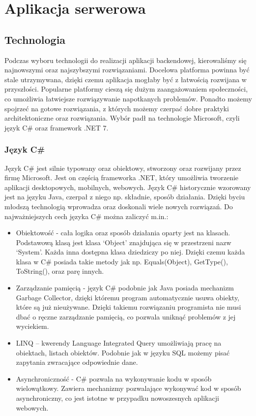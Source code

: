 \documentclass[a4paper,twoside,12pt]{book}
\begin{document}
\chapter{Aplikacja serwerowa}
\section{Technologia}
Podczas wyboru technologii do realizacji aplikacji backendowej, kierowaliśmy się najnowszymi oraz najszybszymi rozwiązaniami. Docelowa platforma powinna być stale utrzymywana, dzięki czemu aplikacja mogłaby być z łatwością rozwijana w przyszłości. Popularne platformy cieszą się dużym zaangażowaniem społeczności, co umożliwia łatwiejsze rozwiązywanie napotkanych problemów. Ponadto możemy spojrzeć na gotowe rozwiązania, z których możemy czerpać dobre praktyki architektoniczne oraz rozwiązania. Wybór padł na technologie Microsoft, czyli język C\# oraz framework .NET 7.  

\subsection{Język C\#}
Język C\# jest silnie typowany oraz obiektowy, stworzony oraz rozwijany przez firmę Microsoft. Jest on częścią frameworka .NET, który umożliwia tworzenie aplikacji desktopowych, mobilnych, webowych.  Język C\# historycznie wzorowany jest na języku Java, czerpał z niego np. składnie, sposób działania. Dzięki byciu młodszą technologią wprowadza oraz doskonali wiele nowych rozwiązań.  
Do najważniejszych cech języka C\# można zaliczyć m.in.: 
\begin{itemize}
    \item Obiektowość - cała logika oraz sposób działania oparty jest na klasach. Podstawową klasą jest klasa ‘Object’ znajdująca się w przestrzeni nazw ‘System’. Każda inna dostępna klasa dziedziczy po niej. Dzięki czemu każda klasa w C\# posiada takie metody jak np. Equals(Object), GetType(), ToString(), oraz parę innych. 
    \item Zarządzanie pamięcią - język C\# podobnie jak Java posiada mechanizm Garbage Collector, dzięki któremu program automatycznie usuwa obiekty, które są już nieużywane. Dzięki takiemu rozwiązaniu programista nie musi dbać o ręczne zarządzanie pamięcią, co pozwala uniknąć problemów z jej wyciekiem. 
    \item LINQ – kwerendy Language Integrated Query umożliwiają pracę na obiektach, listach obiektów. Podobnie jak w języku SQL możemy pisać zapytania zwracające odpowiednie dane.
    \item Asynchroniczność - C\# pozwala na wykonywanie kodu w sposób wielowątkowy. Zawiera mechanizmy pozwalające wykonywać kod w sposób asynchroniczny, co jest istotne w przypadku nowoszesnych aplikacji webowych.
\end{itemize}
\end{document}
